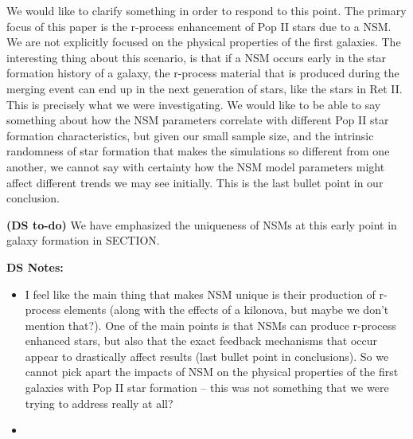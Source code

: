 \documentclass[11pt]{article}
\begin{document}
We would like to clarify something in order to respond to this point. The primary focus of this paper is the r-process enhancement of Pop II stars due to a NSM. We are not explicitly focused on the physical properties of the first galaxies. The interesting thing about this scenario, is that if a NSM occurs early in the star formation history of a galaxy, the r-process material that is produced during the merging event can end up in the next generation of stars, like the stars in Ret II. This is precisely what we were investigating. We would like to be able to say something about how the NSM parameters correlate with different Pop II star formation characteristics, but given our small sample size, and the intrinsic randomness of star formation that makes the simulations so different from one another, we cannot say with certainty how the NSM model parameters might affect different trends we may see initially. This is the last bullet point in our conclusion. 

\textbf{(DS to-do)} We have emphasized the uniqueness of NSMs at this early point in galaxy formation in SECTION.

\textbf{DS Notes:}
\begin{itemize}
    \item I feel like the main thing that makes NSM unique is their production of r-process elements (along with the effects of a kilonova, but maybe we don't mention that?). One of the main points is that NSMs can produce r-process enhanced stars, but also that the exact feedback mechanisms that occur appear to drastically affect results (last bullet point in conclusions). So we cannot pick apart the impacts of NSM on the physical properties of the first galaxies with Pop II star formation -- this was not something that we were trying to address really at all?
    \item {}
\end{itemize}
\end{document}
